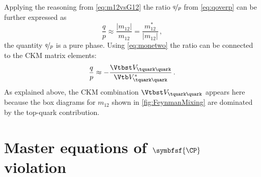 Applying the reasoning from \cref{eq:m12vsG12} the ratio $\nicefrac{q}{p}$ from \cref{eq:qoverp} can be further expressed as
\begin{equation}
\frac{q}{p}\approx\frac{\left|m_{12}\right|}{m_{12}}=\frac{m_{12}^\ast}{\left|m_{12}\right|}\,,\label{eq:qoverPPurePhase}
\end{equation}
\ie the quantity $\nicefrac{q}{p}$ is a pure phase.
Using \cref{eq:monetwo} the ratio can be connected to the CKM matrix elements:
\begin{equation}
\frac{q}{p}\approx-\frac{\Vtbst V_{\tquark\quark}}{\Vtb V_{\tquark\quark}^\ast}\label{eq:qoverpCKM}\,.
\end{equation}
As explained above, the CKM combination $\Vtbst V_{\tquark\quark}$ appears here because the box diagrams for $m_{12}$ shown in \cref{fig:FeynmanMixing} are dominated by the top-quark contribution.


\section[head={Master equations of \CP violation},tocentry={Master equations of \CP violation}]{Master equations of $\symbfsf{\CP}$ violation}
\label{sec:formulaeCPV}

